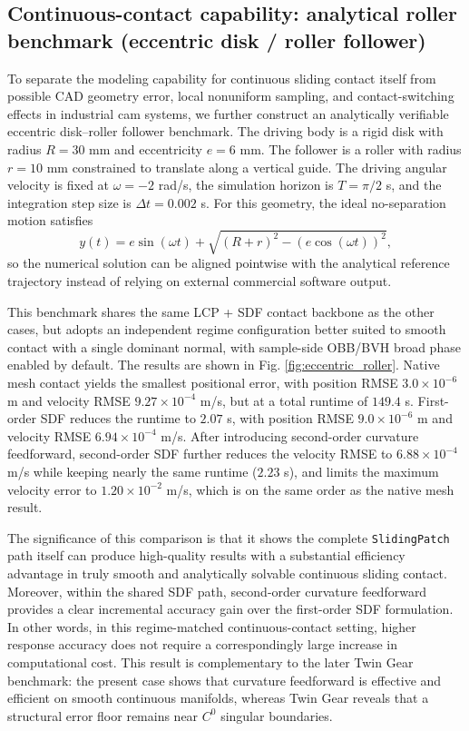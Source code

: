 \subsection{Continuous-contact capability: analytical roller benchmark (eccentric disk / roller follower)}
To separate the modeling capability for continuous sliding contact itself from possible CAD geometry error, local nonuniform sampling, and contact-switching effects in industrial cam systems, we further construct an analytically verifiable eccentric disk--roller follower benchmark. The driving body is a rigid disk with radius $R=30$ mm and eccentricity $e=6$ mm. The follower is a roller with radius $r=10$ mm constrained to translate along a vertical guide. The driving angular velocity is fixed at $\omega=-2$ rad/s, the simulation horizon is $T=\pi/2$ s, and the integration step size is $\Delta t=0.002$ s. For this geometry, the ideal no-separation motion satisfies
\[
y(t)=e\sin(\omega t)+\sqrt{(R+r)^2-(e\cos(\omega t))^2},
\]
so the numerical solution can be aligned pointwise with the analytical reference trajectory instead of relying on external commercial software output.

This benchmark shares the same LCP + SDF contact backbone as the other cases, but adopts an independent regime configuration better suited to smooth contact with a single dominant normal, with sample-side OBB/BVH broad phase enabled by default. The results are shown in Fig. \ref{fig:eccentric_roller}. Native mesh contact yields the smallest positional error, with position RMSE $3.0\times10^{-6}$ m and velocity RMSE $9.27\times10^{-4}$ m/s, but at a total runtime of $149.4$ s. First-order SDF reduces the runtime to $2.07$ s, with position RMSE $9.0\times10^{-6}$ m and velocity RMSE $6.94\times10^{-4}$ m/s. After introducing second-order curvature feedforward, second-order SDF further reduces the velocity RMSE to $6.88\times10^{-4}$ m/s while keeping nearly the same runtime ($2.23$ s), and limits the maximum velocity error to $1.20\times10^{-2}$ m/s, which is on the same order as the native mesh result.

The significance of this comparison is that it shows the complete \texttt{SlidingPatch} path itself can produce high-quality results with a substantial efficiency advantage in truly smooth and analytically solvable continuous sliding contact. Moreover, within the shared SDF path, second-order curvature feedforward provides a clear incremental accuracy gain over the first-order SDF formulation. In other words, in this regime-matched continuous-contact setting, higher response accuracy does not require a correspondingly large increase in computational cost. This result is complementary to the later Twin Gear benchmark: the present case shows that curvature feedforward is effective and efficient on smooth continuous manifolds, whereas Twin Gear reveals that a structural error floor remains near $C^0$ singular boundaries.

